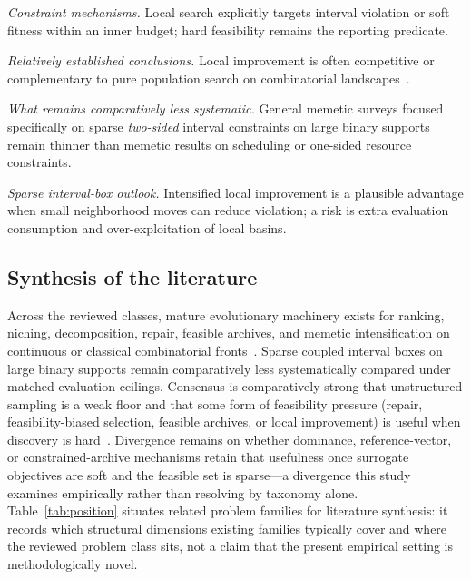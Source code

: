 \documentclass[lettersize,journal]{IEEEtran}
\begin{document}
\emph{Constraint mechanisms.}
Local search explicitly targets interval violation or soft fitness within an inner budget; hard feasibility remains the reporting predicate.

\emph{Relatively established conclusions.}
Local improvement is often competitive or complementary to pure population search on combinatorial landscapes~\cite{li2024empiricalcompari3898,derbel2025asimplecombinatia389,rahman2019aneffectivememet26b9}.

\emph{What remains comparatively less systematic.}
General memetic surveys focused specifically on sparse \emph{two-sided} interval constraints on large binary supports remain thinner than memetic results on scheduling or one-sided resource constraints.

\emph{Sparse interval-box outlook.}
Intensified local improvement is a plausible advantage when small neighborhood moves can reduce violation; a risk is extra evaluation consumption and over-exploitation of local basins.

\subsection{Synthesis of the literature}
Across the reviewed classes, mature evolutionary machinery exists for ranking, niching, decomposition, repair, feasible archives, and memetic intensification on continuous or classical combinatorial fronts~\cite{deb2002,zhang2007,zitzler2001,cheng2016,li2019ctaea,zhunfan2015anoppositionbasec800,yu2024adualpopulationc9fb6,li2024empiricalcompari3898}.
Sparse coupled interval boxes on large binary supports remain comparatively less systematically compared under matched evaluation ceilings.
Consensus is comparatively strong that unstructured sampling is a weak floor and that some form of feasibility pressure (repair, feasibility-biased selection, feasible archives, or local improvement) is useful when discovery is hard~\cite{zhunfan2015anoppositionbasec800,kan2017aconstrainedmult6073,yu2024adualpopulationc9fb6,zhao2025acmodiet}.
Divergence remains on whether dominance, reference-vector, or constrained-archive mechanisms retain that usefulness once surrogate objectives are soft and the feasible set is sparse---a divergence this study examines empirically rather than resolving by taxonomy alone.
Table~\ref{tab:position} situates related problem families for literature synthesis: it records which structural dimensions existing families typically cover and where the reviewed problem class sits, not a claim that the present empirical setting is methodologically novel.
\end{document}
